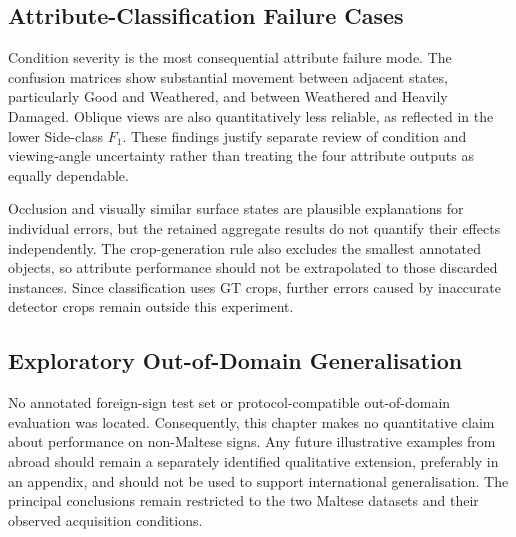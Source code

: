 
\subsection{Attribute-Classification Failure Cases}
\label{sec:ev-attribute-failures}
Condition severity is the most consequential attribute failure mode. The confusion matrices show substantial movement between adjacent states, particularly Good and Weathered, and between Weathered and Heavily Damaged. Oblique views are also quantitatively less reliable, as reflected in the lower Side-class \(F_1\). These findings justify separate review of condition and viewing-angle uncertainty rather than treating the four attribute outputs as equally dependable.

Occlusion and visually similar surface states are plausible explanations for individual errors, but the retained aggregate results do not quantify their effects independently. The crop-generation rule also excludes the smallest annotated objects, so attribute performance should not be extrapolated to those discarded instances. Since classification uses \gls{GT} crops, further errors caused by inaccurate detector crops remain outside this experiment.


\subsection{Exploratory Out-of-Domain Generalisation}
\label{sec:ev-out-of-domain}
No annotated foreign-sign test set or protocol-compatible out-of-domain evaluation was located. Consequently, this chapter makes no quantitative claim about performance on non-Maltese signs. Any future illustrative examples from abroad should remain a separately identified qualitative extension, preferably in an appendix, and should not be used to support international generalisation. The principal conclusions remain restricted to the two Maltese datasets and their observed acquisition conditions.

